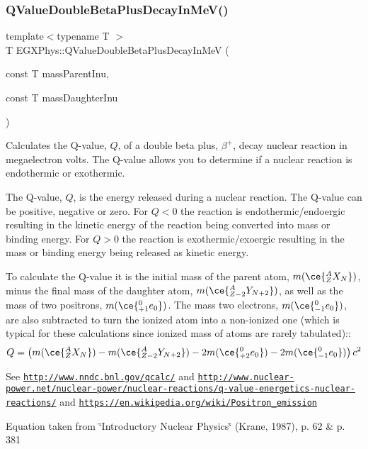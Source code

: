 \subsubsection{\texorpdfstring{Q\+Value\+Double\+Beta\+Plus\+Decay\+In\+Me\+V()}{QValueDoubleBetaPlusDecayInMeV()}}
{\footnotesize\ttfamily template$<$typename T $>$ \\
T E\+G\+X\+Phys\+::\+Q\+Value\+Double\+Beta\+Plus\+Decay\+In\+MeV (\begin{DoxyParamCaption}\item[{const T}]{mass\+Parent\+Inu,  }\item[{const T}]{mass\+Daughter\+Inu }\end{DoxyParamCaption})}



Calculates the Q-\/value, $Q$, of a double beta plus, $\beta^+$, decay nuclear reaction in megaelectron volts. The Q-\/value allows you to determine if a nuclear reaction is endothermic or exothermic. 

The Q-\/value, $Q$, is the energy released during a nuclear reaction. The Q-\/value can be positive, negative or zero. For $Q < 0$ the reaction is endothermic/endoergic resulting in the kinetic energy of the reaction being converted into mass or binding energy. For $Q > 0$ the reaction is exothermic/exoergic resulting in the mass or binding energy being released as kinetic energy.

To calculate the Q-\/value it is the initial mass of the parent atom, $m(\ce{ ^{A}_{Z}X_{N} })$, minus the final mass of the daughter atom, $m(\ce{ ^{A}_{Z -2}Y_{N +2} })$, as well as the mass of two positrons, $m(\ce{ ^{0}_{+1}e_{0} })$. The mass two electrons, $m(\ce{ ^{0}_{-1}e_{0} })$, are also subtracted to turn the ionized atom into a non-\/ionized one (which is typical for these calculations since ionized mass of atoms are rarely tabulated)\+:\+: \[Q = \left ( m(\ce{ ^{A}_{Z}X_{N} })-m(\ce{ ^{A}_{Z -2}Y_{N +2} })-2m(\ce{ ^{0}_{+2}e_{0} }) - 2m(\ce{ ^{0}_{-1}e_{0} }) \right) c^2\]

See \href{http://www.nndc.bnl.gov/qcalc/}{\tt http\+://www.\+nndc.\+bnl.\+gov/qcalc/} and \href{http://www.nuclear-power.net/nuclear-power/nuclear-reactions/q-value-energetics-nuclear-reactions/}{\tt http\+://www.\+nuclear-\/power.\+net/nuclear-\/power/nuclear-\/reactions/q-\/value-\/energetics-\/nuclear-\/reactions/} and \href{https://en.wikipedia.org/wiki/Positron_emission}{\tt https\+://en.\+wikipedia.\+org/wiki/\+Positron\+\_\+emission}

Equation taken from \char`\"{}\+Introductory Nuclear Physics\char`\"{} (Krane, 1987), p. 62 \& p. 381


